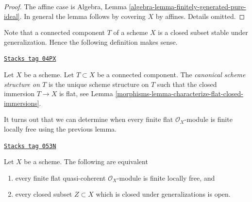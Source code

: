 \begin{proof}
The affine case is
Algebra, Lemma \ref{algebra-lemma-finitely-generated-pure-ideal}.
In general the lemma follows by covering $X$ by affines.
Details omitted.
\end{proof}

Note that a connected component $T$ of a scheme $X$ is a closed
subset stable under generalization. Hence the following definition
makes sense.

\begin{definition}
\label{morphisms-definition-scheme-structure-connected-component}
\href{https://stacks.math.columbia.edu/tag/04PX}{\texttt{Stacks tag 04PX}}

Let $X$ be a scheme. Let $T \subset X$ be a connected component.
The {\it canonical scheme structure on $T$} is the unique
scheme structure on $T$ such that the closed immersion $T \to X$
is flat, see
Lemma \ref{morphisms-lemma-characterize-flat-closed-immersions}.
\end{definition}

It turns out that we can determine when every finite flat
$\mathcal{O}_X$-module is finite locally free using the previous lemma.

\begin{lemma}
\label{morphisms-lemma-finite-flat-is-finite-locally-free}
\href{https://stacks.math.columbia.edu/tag/053N}{\texttt{Stacks tag 053N}}

Let $X$ be a scheme. The following are equivalent
\begin{enumerate}
\item every finite flat quasi-coherent $\mathcal{O}_X$-module is
finite locally free, and
\item every closed subset $Z \subset X$ which is closed under generalizations
is open.
\end{enumerate}
\end{lemma}

